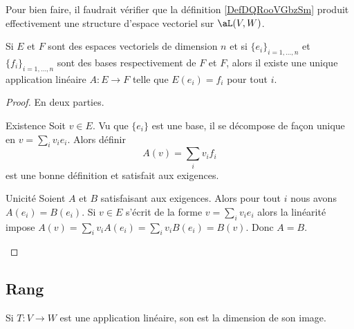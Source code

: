 \begin{normaltext}
    Pour bien faire, il faudrait vérifier que la définition \ref{DefDQRooVGbzSm} produit effectivement une structure d'espace vectoriel sur \( \aL(V,W)\).
\end{normaltext}

\begin{proposition}
    Si \( E\) et \( F\) sont des espaces vectoriels de dimension \( n\) et si \( \{ e_i \}_{i=1,\ldots, n}\) et \( \{ f_i \}_{i=1,\ldots, n}\) sont des bases respectivement de \( F\) et \( F\), alors il existe une unique application linéaire \( A\colon E\to F\) telle que \( E(e_i)=f_i\) pour tout \( i\).
\end{proposition}

\begin{proof}
    En deux parties.\begin{subproof}
        \item[Existence]
            Soit \( v\in E\). Vu que \( \{ e_i \}\) est une base, il se décompose de façon unique en \( v=\sum_iv_ie_i\). Alors définir
            \begin{equation}
                A(v)=\sum_iv_if_i
            \end{equation}
            est une bonne définition et satisfait aux exigences.
        \item[Unicité]
            Soient \( A\) et \( B\) satisfaisant aux exigences. Alors pour tout \( i\) nous avons \( A(e_i)=B(e_i)\). Si \( v\in E\) s'écrit de la forme \( v=\sum_iv_ie_i\) alors la linéarité impose \( A(v)=\sum_iv_iA(e_i)=\sum_iv_iB(e_i)=B(v)\). Donc \( A=B\).
    \end{subproof}
\end{proof}

\subsection{Rang}

\begin{definition}\label{DefALUAooSPcmyK}
    Si  $T\colon V\to W$ est une application linéaire, son  est la dimension de son image. 
\end{definition}

